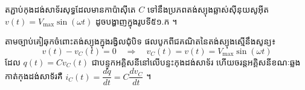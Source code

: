 
\vspace{0.2em}
\noindent
\begin{minipage}[t]{0.56\textwidth}
	\vspace{0pt}
	\raggedright
	តភ្ជាប់កុងដង់សាទ័រសុទ្ធដែលមានកាប៉ាស៊ីតេ $C$ ទៅនឹងប្រភពតង់ស្យុងឆ្លាស់ស៊ីនុយសូអុីត $v(t) = V_{\max}\sin(\omega t)$ ដូចបង្ហាញក្នុងរូបទី៥១.ក ។

	\vspace{0.4em}
	តាមច្បាប់គៀឆុកចំពោះតង់ស្យុងក្នុងរង្វិលជុំបិទ ផលបូកពីជគណិតនៃតង់ស្យុងស្មើនឹងសូន្យ៖
	\[ v(t) - v_C(t) = 0 \quad \Longrightarrow \quad v_C(t) = v(t) = V_{\max}\sin(\omega t) \]
	ដែល $q(t) = C v_C(t)$ ជាបន្ទុកអគ្គិសនីនៅលើបន្ទះកុងដង់សាទ័រ ហើយចរន្តអគ្គិសនីខណៈឆ្លងកាត់កុងដង់សាទ័រគឺ $i_C(t) = \dfrac{dq}{dt} = C\dfrac{dv_C}{dt}$ ។
\end{minipage}%
\hfill
